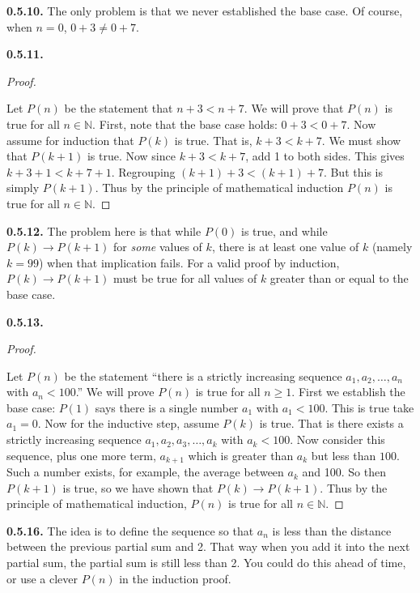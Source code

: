 \documentclass[10pt,]{book}
\theoremstyle{plain}
\theoremstyle{definition}
\theoremstyle{definition}
\theoremstyle{definition}
\theoremstyle{definition}
\numberwithin{equation}{chapter}
\newcommand{\N}{\mathbb N}
\newcommand{\imp}{\rightarrow}
\newcommand{\lt}{<}
\begin{document}
\par\smallskip
\noindent\textbf{0.5.10.} \hypertarget{p-477}{}%
The only problem is that we never established the base case. Of course, when \(n = 0\), \(0+3 \ne 0+7\).%
\par\smallskip
\noindent\textbf{0.5.11.} \begin{proof}\hypertarget{proof-14}{}
\hypertarget{p-479}{}%
Let \(P(n)\) be the statement that \(n + 3 \lt  n + 7\). We will prove that \(P(n)\) is true for all \(n \in \N\). First, note that the base case holds: \(0+3 \lt  0+7\). Now assume for induction that \(P(k)\) is true. That is, \(k+3 \lt  k+7\). We must show that \(P(k+1)\) is true. Now since \(k + 3 \lt  k + 7\), add 1 to both sides. This gives \(k + 3 + 1 \lt  k + 7 + 1\). Regrouping \((k+1) + 3 \lt  (k+1) + 7\). But this is simply \(P(k+1)\). Thus by the principle of mathematical induction \(P(n)\) is true for all \(n \in \N\).%
\end{proof}
\par\smallskip
\noindent\textbf{0.5.12.} \hypertarget{p-482}{}%
The problem here is that while \(P(0)\) is true, and while \(P(k) \imp P(k+1)\) for \emph{some} values of \(k\), there is at least one value of \(k\) (namely \(k = 99\)) when that implication fails. For a valid proof by induction, \(P(k) \imp P(k+1)\) must be true for all values of \(k\) greater than or equal to the base case.%
\par\smallskip
\noindent\textbf{0.5.13.} \begin{proof}\hypertarget{proof-16}{}
\hypertarget{p-484}{}%
Let \(P(n)\) be the statement ``there is a strictly increasing sequence \(a_1, a_2, \ldots, a_n\) with \(a_n \lt  100\).'' We will prove \(P(n)\) is true for all \(n \ge 1\). First we establish the base case: \(P(1)\) says there is a single number \(a_1\) with \(a_1 \lt  100\). This is true \textendash{} take \(a_1 = 0\). Now for the inductive step, assume \(P(k)\) is true. That is there exists a strictly increasing sequence \(a_1, a_2, a_3, \ldots, a_k\) with \(a_k \lt  100\). Now consider this sequence, plus one more term, \(a_{k+1}\) which is greater than \(a_k\) but less than \(100\). Such a number exists, for example, the average between \(a_k\) and 100. So then \(P(k+1)\) is true, so we have shown that \(P(k) \imp P(k+1)\). Thus by the principle of mathematical induction, \(P(n)\) is true for all \(n \in \N\).%
\end{proof}
\par\smallskip
\noindent\textbf{0.5.16.} \hypertarget{p-489}{}%
The idea is to define the sequence so that \(a_n\) is less than the distance between the previous partial sum and 2. That way when you add it into the next partial sum, the partial sum is still less than 2. You could do this ahead of time, or use a clever \(P(n)\) in the induction proof.%
\end{document}
